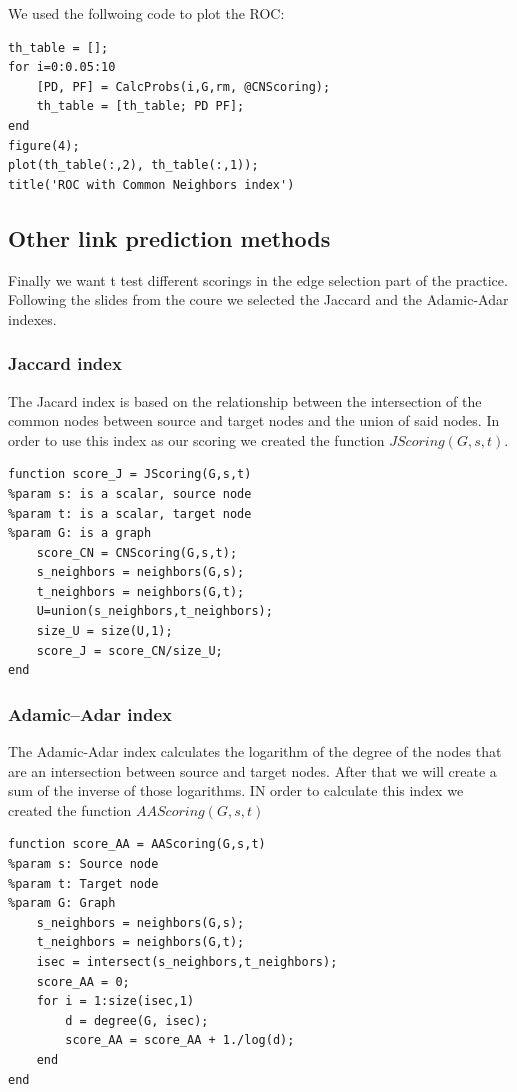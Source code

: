 \documentclass[12pt]{article}
\begin{document}
We used the follwoing code to plot the ROC:
\begin{lstlisting}
th_table = [];
for i=0:0.05:10 
    [PD, PF] = CalcProbs(i,G,rm, @CNScoring);
    th_table = [th_table; PD PF];
end
figure(4);
plot(th_table(:,2), th_table(:,1));
title('ROC with Common Neighbors index')
\end{lstlisting}

\subsection{Other link prediction methods}
Finally we want t test different scorings in the edge selection part of the practice. Following the slides from the coure we selected the Jaccard and the Adamic-Adar indexes. 
\subsubsection{Jaccard index}
\justifying
The Jacard index is based on the relationship between the intersection of the common nodes between source and target nodes and the union of said nodes. In order to use this index as our scoring we created the function $JScoring(G,s,t)$.
\begin{lstlisting}
function score_J = JScoring(G,s,t)
%param s: is a scalar, source node
%param t: is a scalar, target node
%param G: is a graph
    score_CN = CNScoring(G,s,t);
    s_neighbors = neighbors(G,s);
    t_neighbors = neighbors(G,t);
    U=union(s_neighbors,t_neighbors);
    size_U = size(U,1);
    score_J = score_CN/size_U;
end
\end{lstlisting}

\subsubsection{Adamic–Adar index}
\justifying
The Adamic-Adar index calculates the logarithm of the degree of the nodes that are an intersection between source and target nodes. After that we will create a sum of the inverse of those logarithms. IN order to calculate this index we created the function $AAScoring(G,s,t)$
\begin{lstlisting}
function score_AA = AAScoring(G,s,t)
%param s: Source node
%param t: Target node
%param G: Graph
    s_neighbors = neighbors(G,s);
    t_neighbors = neighbors(G,t);
    isec = intersect(s_neighbors,t_neighbors);
    score_AA = 0;
    for i = 1:size(isec,1)
        d = degree(G, isec);
        score_AA = score_AA + 1./log(d);
    end
end
\end{lstlisting}
\end{document}
